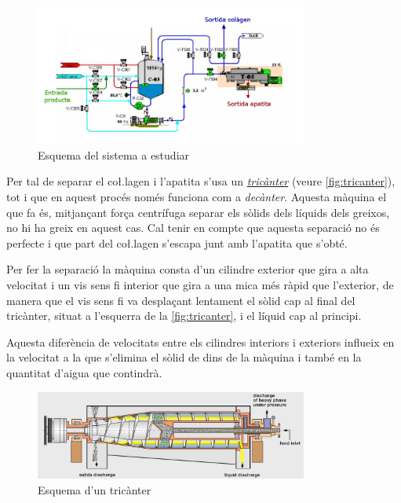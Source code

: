 \documentclass[a4paper]{article}
\begin{document}
\begin{figure}[H]
	\centering
	\includegraphics[width=0.8\textwidth]{images/esquema}
	\caption{Esquema del sistema a estudiar}
	\label{fig:esquema}
\end{figure}

Per tal de separar el co\l.lagen i l'apatita s'usa un \emph{\href{https://youtu.be/uvWcLZWM_JY}{tricànter}} (veure \autoref{fig:tricanter}), tot i que en aquest procés només funciona com a \emph{decànter}. Aquesta màquina el que fa és, mitjançant força centrífuga separar els sòlids dels líquids dels greixos, no hi ha greix en aquest cas. Cal tenir en compte que aquesta separació no és perfecte i que part del co\l.lagen s'escapa junt amb l'apatita que s'obté.

Per fer la separació la màquina consta d'un cilindre exterior que gira a alta velocitat i un vis sens fi interior que gira a una mica més ràpid que l'exterior, de manera que el vis sens fi va desplaçant lentament el sòlid cap al final del tricànter, situat a l'esquerra de la \autoref{fig:tricanter}, i el líquid cap al principi. 

Aquesta diferència de velocitats entre els cilindres interiors i exteriors influeix en la velocitat a la que s'elimina el sòlid de dins de la màquina i també en la quantitat d'aigua que contindrà.

\begin{figure}[H]
	\centering
	\includegraphics[width=0.8\textwidth]{images/tricanter}
	\caption{Esquema d'un tricànter}
	\label{fig:tricanter}
\end{figure}
\end{document}
